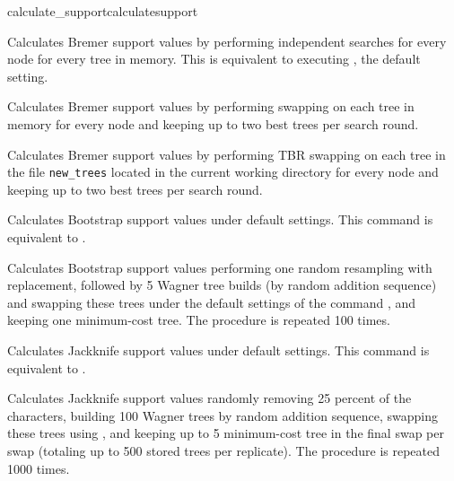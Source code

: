 \begin{command}{calculate\_support}{calculatesupport}
\begin{statement}
    \begin{poyexamples} 

            {Calculates Bremer support values by performing
            independent searches for every node for every tree in memory. 
            This is equivalent to executing , the default setting.}
         
            {Calculates Bremer support values by performing swapping on 
            each tree in memory for every node and keeping up to two
            best trees per search round.}
          
            {Calculates Bremer support values by performing TBR swapping on 
            each tree in the file \texttt{new\_trees} located in the current
            working directory for every node and keeping up to two
            best trees per search round.}  
            
            {Calculates Bootstrap support values under default settings. This command
            is equivalent to .}
    
            {Calculates Bootstrap support values performing one random resampling with
            replacement, followed by 5 Wagner tree builds (by random addition sequence)
            and swapping these trees under the default settings of the command 
            , and keeping one minimum-cost tree. The procedure
            is repeated 100 times.}
        
            {Calculates Jackknife support values under default settings.  This command
            is equivalent to .}     
            
            {Calculates Jackknife support values randomly removing 25 percent of the
            characters, building 100 Wagner trees by random addition sequence, swapping 
            these trees using , and keeping up to 5 minimum-cost tree in the
            final swap per swap (totaling up to 500 stored trees per replicate). 
            The procedure is repeated 1000 times.}


\end{poyexamples}
\end{statement}
\end{command}
